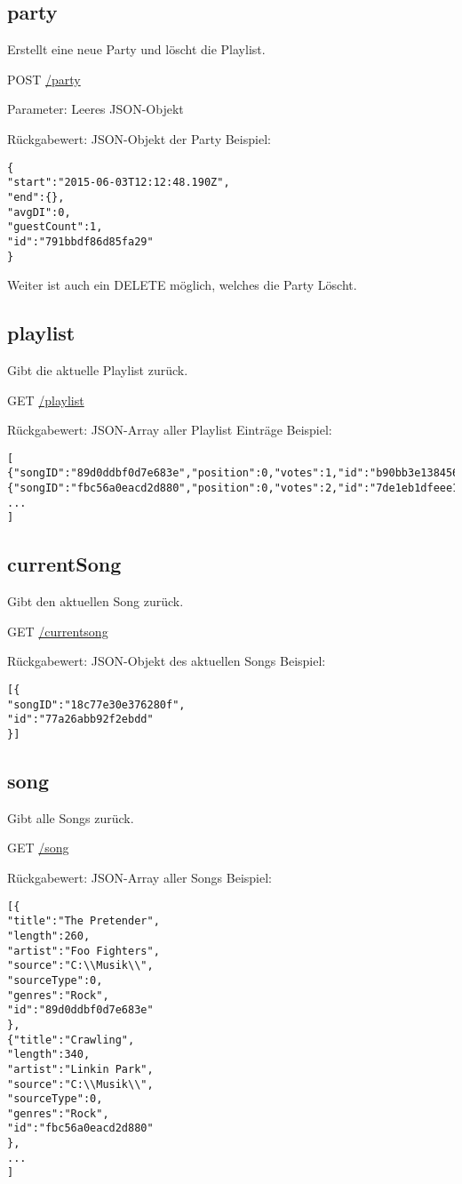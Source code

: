 \subsection{party}
\label{service:party}
Erstellt eine neue Party und löscht die Playlist.

POST
\url{/party}

Parameter: Leeres JSON-Objekt

Rückgabewert: JSON-Objekt der Party
Beispiel:
\begin{lstlisting}
{
"start":"2015-06-03T12:12:48.190Z",
"end":{},
"avgDI":0,
"guestCount":1,
"id":"791bbdf86d85fa29"
}
\end{lstlisting}
Weiter ist auch ein DELETE möglich, welches die Party Löscht.

\subsection{playlist}
\label{service:playlist}
Gibt die aktuelle Playlist zurück.

GET
\url{/playlist}

Rückgabewert: JSON-Array aller Playlist Einträge
Beispiel:
\begin{lstlisting}
[
{"songID":"89d0ddbf0d7e683e","position":0,"votes":1,"id":"b90bb3e138456920"},
{"songID":"fbc56a0eacd2d880","position":0,"votes":2,"id":"7de1eb1dfeee188e"},
...
]
\end{lstlisting}


\subsection{currentSong}
\label{service:currentSong}
Gibt den aktuellen Song zurück.

GET
\url{/currentsong}

Rückgabewert: JSON-Objekt des aktuellen Songs
Beispiel:
\begin{lstlisting}
[{
"songID":"18c77e30e376280f",
"id":"77a26abb92f2ebdd"
}]
\end{lstlisting}

\subsection{song}
\label{service:song}
Gibt alle Songs zurück.

GET
\url{/song}

Rückgabewert: JSON-Array aller Songs
Beispiel:
\begin{lstlisting}
[{
"title":"The Pretender",
"length":260,
"artist":"Foo Fighters",
"source":"C:\\Musik\\",
"sourceType":0,
"genres":"Rock",
"id":"89d0ddbf0d7e683e"
},
{"title":"Crawling",
"length":340,
"artist":"Linkin Park",
"source":"C:\\Musik\\",
"sourceType":0,
"genres":"Rock",
"id":"fbc56a0eacd2d880"
},
...
]
\end{lstlisting}